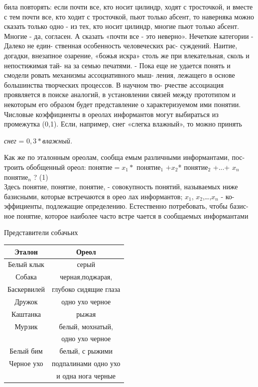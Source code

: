 \documentclass[a4paper]{article}
\begin{document}
	\begin{multicols}{3}
		\noindent била повторять: если почти все, кто носит цилиндр, ходят с тросточкой, и вместе с тем почти все, кто ходит с тросточкой, пьют только абсент, то наверняка можно сказать только одно - из тех, кто носит цилиндр, многие пьют только абсент. Многие - да, согласен. А сказать «почти все - это неверно».
		Нечеткие категории - Далеко не един- ственная особенность человеческих рас- суждений. Наитие, догадки, внезапное озарение, «божья искра» столь же при влекательная, сколь и непостижимая тай-
		на за семью печатями.
		-
		Пока еще не удается понять и смодели ровать механизмы ассоциативного мыш- ления, лежащего в основе большинства творческих процессов. В научном тво- рчестве ассоциация проявляется в поиске аналогий, в установлении связей между прототипом и некоторым его образом	
		будет представление о характеризуемом ими понятии. Числовые коэффициенты в ореолах информантов могут выбираться из промежутка (0,1). Если, например, снег «слегка влажный», то можно принять
		
		\begin{center}\textit{снег} = $0,3*$\textit{влажный.} \end{center}
		
		Как же по эталонным ореолам, сообща емым различными информантами, пос- троить обобщенный ореол: понятие$= x_1 *$  понятие$_1$ $+x_2$* понятие$_2$ +...+ $x_n$ понятие$_n$ ? (1)\\ Здесь понятие, понятие, понятие, - совокупность понятий, называемых ниже базисными, которые встречаются в орео лах информантов; $x_1$, $x_2$,\dots,$x_n$ - ко- эффициенты, подлежащие определению. Естественно потребовать, чтобы базис- ное понятие, которое наиболее часто встре чается в сообщаемых информантами
		\columnbreak
	
	\begin{flushright} \hspace*{0.5cm} Представители собачьих\end{flushright}
	\begin{tabular}{ |c|c| } 
		\hline
		Эталон & Ореол  \\ \hline 
		Белый клык & серый  \\ \hline
		Собака & черная,поджарая,  \\
		Баскервилей & глубоко сидящие глаза \\ \hline
		Дружок & одно ухо черное \\ \hline
		Каштанка & рыжая \\ \hline
		Мурзик & белый, мохнатый, \\ 
		& одно ухо черное \\ \hline
		Белый бим  & белый, с рыжими \\  
		Черное ухо & подпалинами одно ухо \\
		&  и одна нога черные \\ \hline
		
	\end{tabular}	
\end{multicols}

		
\end{document}
